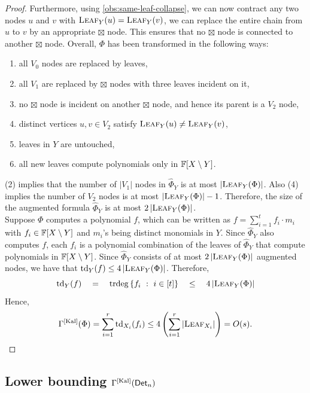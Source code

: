 \begin{proof}
Furthermore, using \autoref{obs:same-leaf-collapse}, we can now contract any two nodes $u$ and $v$ with $\textsc{Leaf}_Y(u) = \textsc{Leaf}_Y(v)$, we can replace the entire chain from $u$ to $v$ by an appropriate $\boxtimes$ node. 
This ensures that no $\boxtimes$ node is connected to another $\boxtimes$ node. 
Overall, $\Phi$ has been transformed in the following ways:
\begin{enumerate}
\itemsep 0pt
\item all $V_0$ nodes are replaced by leaves,
\item all $V_1$ are replaced by $\boxtimes$ nodes with three leaves incident on it,
\item no $\boxtimes$ node is incident on another $\boxtimes$ node, and hence its parent is a $V_2$ node,
\item distinct vertices $u,v\in V_2$ satisfy $\textsc{Leaf}_Y(u) \neq \textsc{Leaf}_Y(v)$, 
\item leaves in $Y$ are untouched,
\item all new leaves compute polynomials only in $\mathbb{F}[X \setminus Y]$.
\end{enumerate}
(2) implies that the number of $|V_1|$ nodes in $\hat{\Phi}_Y$ is at most $\left|\textsc{Leaf}_Y(\Phi)\right|$.
Also (4) implies the number of $V_2$ nodes is at most $\left|\textsc{Leaf}_Y(\Phi)\right| - 1$.
Therefore, the size of the augmented formula $\hat{\Phi}_Y$ is at most $2\left|\textsc{Leaf}_Y(\Phi)\right|$.
\\

Suppose $\Phi$ computes a polynomial $f$, which can be written as $f = \sum_{i=1}^t f_i\cdot m_i$ with $f_i \in \mathbb{F}[X\setminus Y]$ and $m_i$'s being distinct monomials in $Y$.
Since $\hat{\Phi}_Y$ also computes $f$, each $f_i$ is a polynomial combination of the leaves of $\hat{\Phi}_Y$ that compute polynomials in $\mathbb{F}[X \setminus Y]$.
Since $\hat{\Phi}_Y$ consists of at most $2\left|\textsc{Leaf}_Y(\Phi)\right|$ augmented nodes, we have that $\mathrm{td}_Y(f) \leq 4\left|\textsc{Leaf}_Y(\Phi)\right|$.
Therefore,
$$
\mathrm{td}_Y(f) \quad=\quad \mathrm{trdeg}\left\{{f_i}\ : \ {i\in [t]}\right\} \quad\leq\quad 4\left|\textsc{Leaf}_Y(\Phi)\right|
$$
Hence, 
$$
\Gamma^{\mathrm{[Kal]}}(\Phi) = \sum_{i=1}^r \mathrm{td}_{X_i}(f_i) \leq 4\left(\sum_{i=1}^r \left|\textsc{Leaf}_{X_i}\right|\right) = O(s).\qedhere
$$
\end{proof}

\subsection{Lower bounding $\Gamma^{\mathrm{[Kal]}}(\operatorname{\mathsf{Det}}_n)$}


